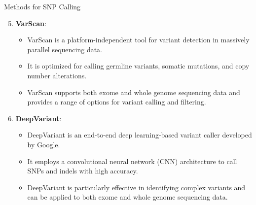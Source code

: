 \documentclass[
  ignorenonframetext,
]{beamer}
\providecommand{\tightlist}{%
  \setlength{\itemsep}{0pt}\setlength{\parskip}{0pt}}
\begin{document}
\begin{frame}{Methods for SNP Calling}
\label{methods-for-snp-calling-2}
\Large

\begin{enumerate}
\setcounter{enumi}{4}
\tightlist
\item
  \textbf{VarScan}:

  \begin{itemize}
  \tightlist
  \item
    VarScan is a platform-independent tool for variant detection in
    massively parallel sequencing data.
  \item
    It is optimized for calling germline variants, somatic mutations,
    and copy number alterations.
  \item
    VarScan supports both exome and whole genome sequencing data and
    provides a range of options for variant calling and filtering.
  \end{itemize}
\item
  \textbf{DeepVariant}:

  \begin{itemize}
  \tightlist
  \item
    DeepVariant is an end-to-end deep learning-based variant caller
    developed by Google.
  \item
    It employs a convolutional neural network (CNN) architecture to call
    SNPs and indels with high accuracy.
  \item
    DeepVariant is particularly effective in identifying complex
    variants and can be applied to both exome and whole genome
    sequencing data.
  \end{itemize}
\end{enumerate}
\end{frame}
\end{document}

